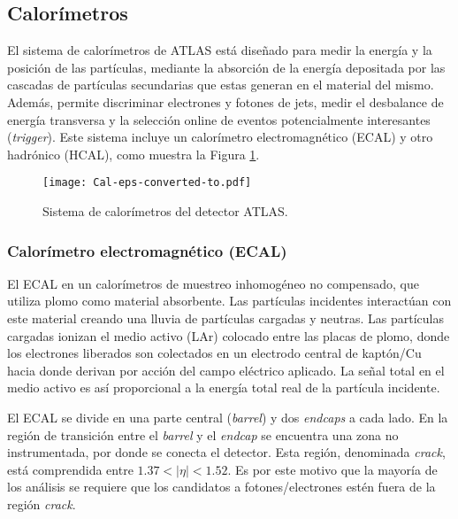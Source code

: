\subsection{Calorímetros}

El sistema de calorímetros de ATLAS está diseñado para medir la energía y la posición de las partículas, mediante la absorción de la energía depositada por las cascadas de partículas secundarias que estas generan en el material del mismo. Además, permite discriminar electrones y fotones de jets, medir el desbalance de energía transversa y la selección online de eventos potencialmente interesantes (\textit{trigger}). Este sistema incluye un calorímetro electromagnético (ECAL) y otro hadrónico (HCAL), como muestra la Figura \ref{Cal}.

\begin{figure}
\centering
\texttt{[image: Cal-eps-converted-to.pdf]}
\caption{Sistema de calorímetros del detector ATLAS.}
\label{Cal}
\end{figure}

\subsubsection{Calorímetro electromagnético (ECAL)}

El ECAL en un calorímetros de muestreo inhomogéneo no compensado, que utiliza plomo como material absorbente. Las partículas incidentes interactúan con este material creando una lluvia de partículas cargadas y neutras. Las partículas cargadas ionizan el medio activo (LAr) colocado entre las placas de plomo, donde los electrones liberados son colectados en un electrodo central de kaptón/Cu hacia donde derivan por acción del campo eléctrico aplicado. La señal total en el medio activo es así proporcional a la energía total real de la partícula incidente.


El ECAL se divide en una parte central (\textit{barrel}) y dos \textit{endcaps} a cada lado. En la región de transición entre el \textit{barrel} y el \textit{endcap} se encuentra una zona no instrumentada, por donde se conecta el detector. Esta región, denominada \textit{crack}, está comprendida entre $1.37 < |\eta| < 1.52$. Es por este motivo que la mayoría de los análisis se requiere que los candidatos a fotones/electrones estén fuera de la región \textit{crack}.

